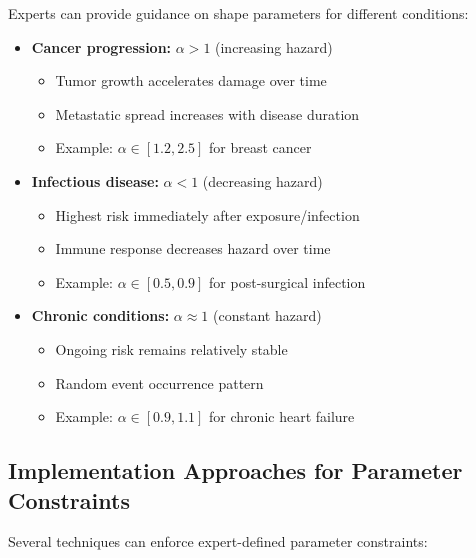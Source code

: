 \begin{examplebox}[title=Disease-Specific Shape Constraints]
Experts can provide guidance on shape parameters for different conditions:

\begin{itemize}
    \item \textbf{Cancer progression:} $\alpha > 1$ (increasing hazard)
    \begin{itemize}
        \item Tumor growth accelerates damage over time
        \item Metastatic spread increases with disease duration
        \item Example: $\alpha \in [1.2, 2.5]$ for breast cancer
    \end{itemize}

    \item \textbf{Infectious disease:} $\alpha < 1$ (decreasing hazard)
    \begin{itemize}
        \item Highest risk immediately after exposure/infection
        \item Immune response decreases hazard over time
        \item Example: $\alpha \in [0.5, 0.9]$ for post-surgical infection
    \end{itemize}

    \item \textbf{Chronic conditions:} $\alpha \approx 1$ (constant hazard)
    \begin{itemize}
        \item Ongoing risk remains relatively stable
        \item Random event occurrence pattern
        \item Example: $\alpha \in [0.9, 1.1]$ for chronic heart failure
    \end{itemize}
\end{itemize}
\end{examplebox}

\subsection{Implementation Approaches for Parameter Constraints}

Several techniques can enforce expert-defined parameter constraints:


